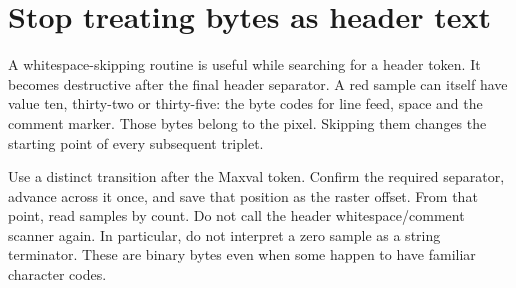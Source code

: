 \section{Stop treating bytes as header text}
A whitespace-skipping routine is useful while searching for a header token. It becomes
destructive after the final header separator. A red sample can itself have value ten,
thirty-two or thirty-five: the byte codes for line feed, space and the comment marker.
Those bytes belong to the pixel. Skipping them changes the starting point of every
subsequent triplet.

Use a distinct transition after the Maxval token. Confirm the required separator,
advance across it once, and save that position as the raster offset. From that point,
read samples by count. Do not call the header whitespace/comment scanner again. In
particular, do not interpret a zero sample as a string terminator. These are binary
bytes even when some happen to have familiar character codes.
